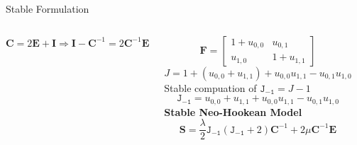 \documentclass[aspectratio=169,xcolor=dvipsnames]{beamer}
\newcommand{\bm}{\boldsymbol}
\begin{document}
\begin{frame}{Stable Formulation}
    \begin{columns}[c] %

        $\bm{C} = 2\bm{E} +  \bm{I} \Longrightarrow \bm{I} - \bm{C}^{-1} = 2 \bm{C}^{-1} \bm{E} $

        $$\bm{F} = \begin{bmatrix}
            1 + u_{0,0} & u_{0,1} \\
            u_{1,0} & 1 + u_{1,1}
        \end{bmatrix}$$
        $$J = 1 + (u_{0,0} + u_{1,1}) + u_{0,0} u_{1,1} - u_{0,1} u_{1,0} $$
        Stable compuation of $\mathtt{J_{-1}} = J - 1$ 
        $$\mathtt{J_{-1}} = u_{0,0} + u_{1,1} + u_{0,0} u_{1,1} - u_{0,1} u_{1,0} $$
        \textbf{Stable Neo-Hookean Model}
        \begin{equation}
            \bm{S} = \frac{\lambda}{2} \mathtt{J_{-1}} \left( \mathtt{J_{-1}} + 2 \right) \bm{C}^{-1} + 2 \mu \bm{C}^{-1} \bm{E} \nonumber 
        \end{equation}

    \end{columns}

\end{frame}
\end{document}
